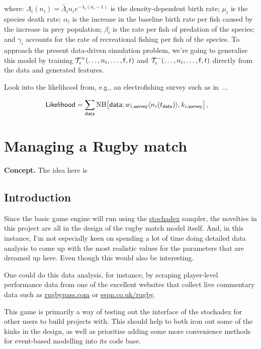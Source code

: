 \documentclass{book}
\begin{document}
where: $\Lambda_{i}(n_{i}) = \tilde{\Lambda_{i}}n_{i}e^{-\lambda_i(n_{i}-1)}$ is the density-dependent birth rate; $\mu_{i}$ is the species death rate; $\alpha_{i}$ is the increase in the baseline birth rate per fish caused by the increase in prey population; $\beta_{i}$ is the rate per fish of predation of the species; and $\gamma_{i}$ accounts for the rate of recreational fishing per fish of the species. To approach the present data-driven simulation problem, we're going to generalise this model by training ${\cal T}^{+}_{i}(\dots, n_i, \dots, {\sf f}, t)$ and ${\cal T}^{-}_{i}(\dots, n_i, \dots, {\sf f}, t)$ directly from the data and generated features.

Look into the likelihood from, e.g., an electrofishing survey such as in~\cite{envagency2015}...

\begin{align}
{\sf Likelihood} &= \sum_{{\sf data}}{\rm NB}\big[{\sf data};w_{i,{\sf survey}}\langle n_i(t_{{\sf data}})\rangle,k_{i,{\sf survey}}\big] \,,
\end{align}


\chapter{\sffamily Managing a Rugby match}

{\bfseries\sffamily Concept.} The idea here is 

\section{\sffamily Introduction}

Since the basic game engine will run using the \href{https://github.com/umbralcalc/stochadex}{stochadex} sampler, the novelties in this project are all in the design of the rugby match model itself. And, in this instance, I'm not especially keen on spending a lot of time doing detailed data analysis to come up with the most realistic values for the parameters that are dreamed up here. Even though this would also be interesting.

One could do this data analysis, for instance, by scraping player-level performance data from one of the excellent websites that collect live commentary data such as \href{https://www.rugbypass.com/}{rugbypass.com} or \href{https://www.espn.co.uk/rugby/}{espn.co.uk/rugby}.

This game is primarily a way of testing out the interface of the stochadex for other users to build projects with. This should help to both iron out some of the kinks in the design, as well as prioritise adding some more convenience methods for event-based modelling into its code base.
\end{document}
